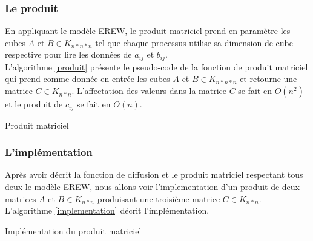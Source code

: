 \subsubsection{Le produit}

En appliquant le modèle EREW, le produit matriciel prend en paramètre les cubes $A$ et $B \in K_{n*n*n}$ tel que chaque processus utilise sa dimension de cube respective pour lire les données de $a_{ij}$ et $b_{ij}$.\\

L'algorithme \ref{produit} présente le pseudo-code de la fonction de produit matriciel qui prend comme donnée en entrée les cubes $A$ et $B \in K_{n*n*n}$ et retourne une matrice $C \in K_{n*n}$. L'affectation des valeurs dans la matrice $C$ se fait en $O(n^2)$ et le produit de $c_{ij}$ se fait en $O(n)$.

\incmargin{1em}
\begin{algorithm}[here]
  \dontprintsemicolon
  \caption{Produit matriciel}
  \label{produit}
\end{algorithm}
\decmargin{1em}

\subsubsection{L'implémentation}

Après avoir décrit la fonction de diffusion et le produit matriciel respectant tous deux le modèle EREW, nous allons voir l'implementation d'un produit de deux matrices $A$ et $B \in K_{n*n}$ produisant une troisième matrice $C \in K_{n*n}$.\\

L'algorithme \ref{implementation} décrit l'implémentation.

\incmargin{1em}
\begin{algorithm}[here]
  \dontprintsemicolon
  \caption{Implémentation du produit matriciel}
  \label{implementation}
\end{algorithm}
\decmargin{1em}
